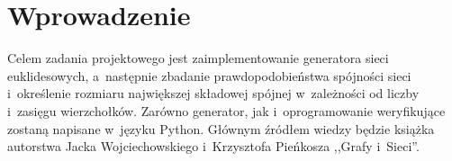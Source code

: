 
\chapter{Wprowadzenie}

Celem zadania projektowego jest zaimplementowanie generatora sieci euklidesowych, a~następnie zbadanie prawdopodobieństwa spójności sieci i~określenie rozmiaru największej składowej spójnej w~zależności od liczby i~zasięgu wierzchołków. Zarówno generator, jak i~oprogramowanie weryfikujące zostaną napisane w~języku Python. Głównym źródłem wiedzy będzie książka autorstwa Jacka Wojciechowskiego i~Krzysztofa Pieńkosza ,,Grafy i~Sieci''.\cite{WojciechowskiJacek2013Gis}
